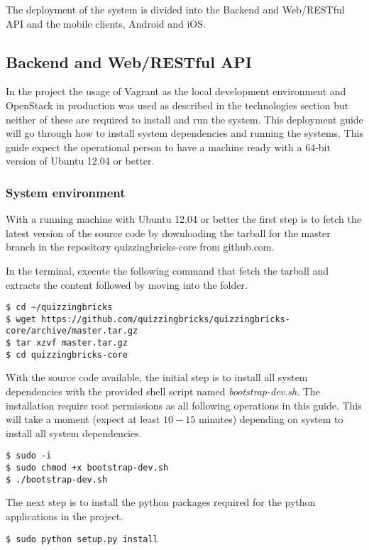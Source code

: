 The deployment of the system is divided into the Backend and Web/RESTful API and the mobile clients, Android and iOS.

\subsection{Backend and Web/RESTful API}
In the project the usage of Vagrant as the local development environment and OpenStack in production was used as described in the technologies section but neither of these are required to install and run the system.
This deployment guide will go through how to install system dependencies and running the systems. This guide expect the operational person to have a machine ready with a 64-bit version of Ubuntu 12.04 or better.

\subsubsection{System environment}
With a running machine with Ubuntu 12.04 or better the first step is to fetch the latest version of the source code by downloading the tarball for the master branch in the repository quizzingbricks-core from github.com.

In the terminal, execute the following command that fetch the tarball and extracts the content followed by moving into the folder.

\begin{verbatim}
$ cd ~/quizzingbricks
$ wget https://github.com/quizzingbricks/quizzingbricks-core/archive/master.tar.gz
$ tar xzvf master.tar.gz
$ cd quizzingbricks-core
\end{verbatim}

With the source code available, the initial step is to install all system dependencies with the provided shell script named \emph{bootstrap-dev.sh}. The installation require root permissions as all following operations in this guide. This will take a moment (expect at least $10-15$ minutes) depending on system to install all system dependencies.

\begin{verbatim}
$ sudo -i
$ sudo chmod +x bootstrap-dev.sh
$ ./bootstrap-dev.sh
\end{verbatim}

The next step is to install the python packages required for the python applications in the project.

\begin{verbatim}
$ sudo python setup.py install
\end{verbatim}

